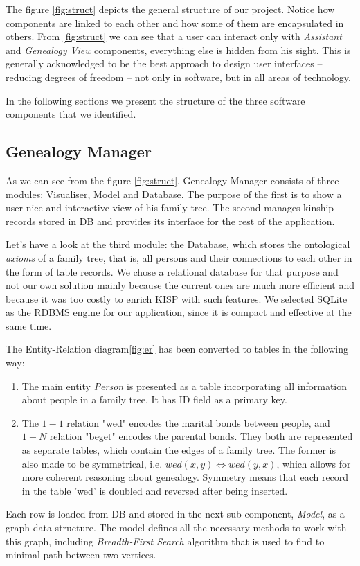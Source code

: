     The figure \ref{fig:struct} depicts the general structure of our project. Notice how components are linked to each other and
    how some of them are encapsulated in others. From \ref{fig:struct} we can see that a user can interact only with
    \textit{Assistant} and \textit{Genealogy View} components, everything else is hidden from his sight. This is generally
    acknowledged to be the best approach to design user interfaces -- reducing degrees of freedom -- not only in software, but in
    all areas of technology.

    In the following sections we present the structure of the three software components that we identified.

\subsection{Genealogy Manager}
    As we can see from the figure \ref{fig:struct}, Genealogy Manager consists of three modules: Visualiser, Model and Database.
    The purpose of the first is to show a user nice and interactive view of his family tree. The second manages kinship
    records stored in DB and provides its interface for the rest of the application.

    Let's have a look at the third module: the Database, which stores the ontological \textit{axioms} of a family tree, that is, all
    persons and
    their connections to each other in the form of table records. We chose a relational database for that purpose and not our own
    solution mainly because the current ones are much more efficient and because it was too costly to enrich KISP with such
    features. We selected SQLite as the RDBMS engine for our application, since it is compact and effective at the same time.

    The Entity-Relation diagram\ref{fig:er} has been converted to tables in the following way:
    \begin{enumerate}
        \item{The main entity \textit{Person} is presented as a table incorporating all information about people in a family tree. It
            has ID field as a primary key. }
        \item{The $1-1$ relation "wed" encodes the marital bonds between people, and $1-N$ relation "beget" encodes the parental
            bonds. They both are represented as separate tables, which contain the edges of a family tree. The former is also made to
            be symmetrical, i.e. $wed(x, y) \iff wed(y, x)$, which allows for more coherent reasoning about genealogy. Symmetry means that
            each record in the table 'wed' is doubled and reversed after being inserted.}
    \end{enumerate}
    Each row is loaded from DB and stored in the next sub-component, \textit{Model}, as a graph data structure. The model defines all
    the necessary methods to work with this graph, including \textit{Breadth-First Search} algorithm that is used to find to minimal
    path between two vertices.

